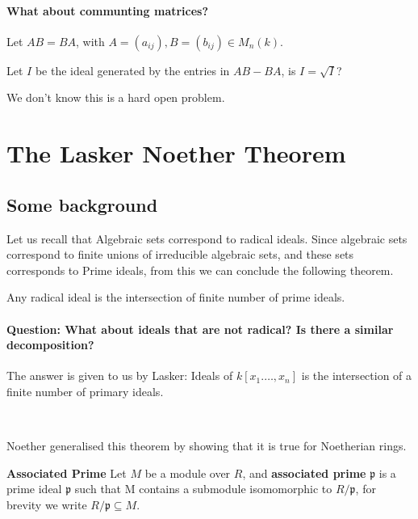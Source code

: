 \paragraph*{What about communting matrices?}
\begin{example}
    Let $AB=BA$, with $A=(a_{ij}),B=(b_{ij})\in M_n(k)$.

    Let $I$ be the ideal generated by the entries in $AB-BA$, is $I = \sqrt{I}$?

    We don't know this is a hard open problem.
\end{example}
\lecture{}

\section{The Lasker Noether Theorem}

\subsection{Some background}

Let us recall that Algebraic sets correspond to radical ideals. Since algebraic sets correspond to finite unions of irreducible algebraic sets, and these sets corresponds to Prime ideals, from this we can conclude the following theorem.

\begin{theorem}
    Any radical ideal is the intersection of finite number of prime ideals.
\end{theorem}

\paragraph*{Question: What about ideals that are not radical? Is there a similar decomposition?}

The answer is given to us by Lasker: Ideals of $k[x_1.\dots,x_n]$ is the intersection of a finite number of primary ideals.

\

Noether generalised this theorem by showing that it is true for Noetherian rings.

\begin{definition}\textbf{Associated Prime}
    Let $M$ be a module over $R$, and \textbf{associated prime }$\mathfrak{p}$ is a prime ideal $\mathfrak{p}$ such that M contains a submodule isomomorphic to $R/\mathfrak{p}$, for brevity we write $R/\mathfrak{p}\subseteq M$.
\end{definition}

